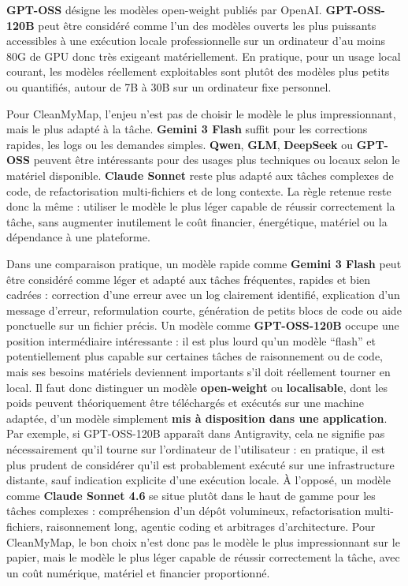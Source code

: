 \documentclass[
  10pt,
  a4paper,
  DIV=11,
  numbers=noendperiod,
  oneside]{scrreprt}
\let\oldtextbf\textbf
\renewcommand{\textbf}[1]{\oldtextbf{\textcolor{cmmnavy}{#1}}}
\begin{document}
\textbf{GPT-OSS} désigne les modèles open-weight publiés par OpenAI.
\textbf{GPT-OSS-120B} peut être considéré comme l'un des modèles ouverts
les plus puissants accessibles à une exécution locale professionnelle
sur un ordinateur d'au moins 80G de GPU donc très exigeant
matériellement. En pratique, pour un usage local courant, les modèles
réellement exploitables sont plutôt des modèles plus petits ou
quantifiés, autour de 7B à 30B sur un ordinateur fixe personnel.

Pour CleanMyMap, l'enjeu n'est pas de choisir le modèle le plus
impressionnant, mais le plus adapté à la tâche. \textbf{Gemini 3 Flash}
suffit pour les corrections rapides, les logs ou les demandes simples.
\textbf{Qwen}, \textbf{GLM}, \textbf{DeepSeek} ou \textbf{GPT-OSS}
peuvent être intéressants pour des usages plus techniques ou locaux
selon le matériel disponible. \textbf{Claude Sonnet} reste plus adapté
aux tâches complexes de code, de refactorisation multi-fichiers et de
long contexte. La règle retenue reste donc la même : utiliser le modèle
le plus léger capable de réussir correctement la tâche, sans augmenter
inutilement le coût financier, énergétique, matériel ou la dépendance à
une plateforme.

Dans une comparaison pratique, un modèle rapide comme \textbf{Gemini 3
Flash} peut être considéré comme léger et adapté aux tâches fréquentes,
rapides et bien cadrées : correction d'une erreur avec un log clairement
identifié, explication d'un message d'erreur, reformulation courte,
génération de petits blocs de code ou aide ponctuelle sur un fichier
précis. Un modèle comme \textbf{GPT-OSS-120B} occupe une position
intermédiaire intéressante : il est plus lourd qu'un modèle ``flash'' et
potentiellement plus capable sur certaines tâches de raisonnement ou de
code, mais ses besoins matériels deviennent importants s'il doit
réellement tourner en local. Il faut donc distinguer un modèle
\textbf{open-weight} ou \textbf{localisable}, dont les poids peuvent
théoriquement être téléchargés et exécutés sur une machine adaptée, d'un
modèle simplement \textbf{mis à disposition dans une application}. Par
exemple, si GPT-OSS-120B apparaît dans Antigravity, cela ne signifie pas
nécessairement qu'il tourne sur l'ordinateur de l'utilisateur : en
pratique, il est plus prudent de considérer qu'il est probablement
exécuté sur une infrastructure distante, sauf indication explicite d'une
exécution locale. À l'opposé, un modèle comme \textbf{Claude Sonnet 4.6}
se situe plutôt dans le haut de gamme pour les tâches complexes :
compréhension d'un dépôt volumineux, refactorisation multi-fichiers,
raisonnement long, agentic coding et arbitrages d'architecture. Pour
CleanMyMap, le bon choix n'est donc pas le modèle le plus impressionnant
sur le papier, mais le modèle le plus léger capable de réussir
correctement la tâche, avec un coût numérique, matériel et financier
proportionné.
\end{document}
